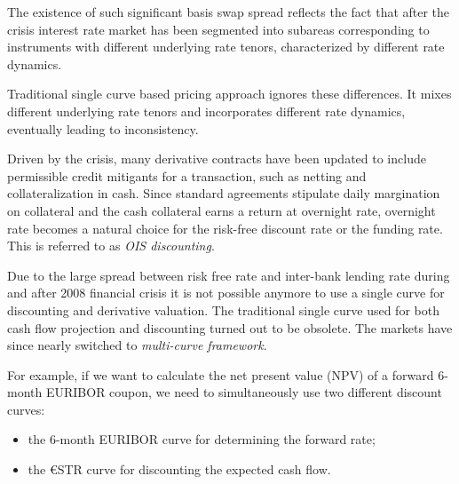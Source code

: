 The existence of such significant basis swap spread reflects the fact that after the crisis interest rate market has been segmented into subareas corresponding to instruments with different underlying rate tenors, characterized by different rate dynamics. 

Traditional single curve based pricing approach ignores these differences. It mixes different underlying rate tenors and incorporates different rate dynamics, eventually leading to inconsistency.

Driven by the crisis, many derivative contracts have been updated to include permissible credit mitigants for a transaction, such as netting and collateralization in cash. Since standard agreements stipulate daily margination on collateral and the cash collateral earns a return at overnight rate, overnight rate becomes a natural choice for the risk-free discount rate or the funding rate. This is referred to as \emph{OIS discounting}.

Due to the large spread between risk free rate and inter-bank lending rate during and after 2008 financial crisis it is not possible anymore to use a single curve for discounting and derivative valuation. The traditional single curve used for both cash flow projection and discounting turned out to be obsolete. The markets have since nearly switched to \emph{multi-curve framework}. 

For example, if we want to calculate the net present value (NPV) of a forward 6-month EURIBOR coupon, we need to simultaneously use two different discount curves: 

\begin{itemize}
\tightlist
\item the 6-month EURIBOR curve for determining the forward rate;
\item the \euro STR curve for discounting the expected cash flow.
\end{itemize}

